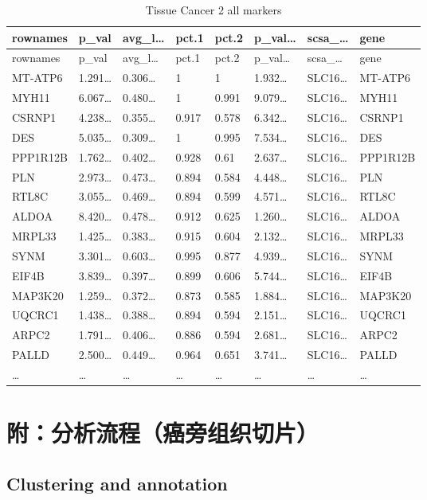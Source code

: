 \documentclass[
]{article}
\begin{document}
\begin{longtable}[]{@{}llllllll@{}}
\caption{\label{tab:Tissue-Cancer-2-all-markers}Tissue Cancer 2 all markers}\tabularnewline
\toprule
rownames & p\_val & avg\_l\ldots{} & pct.1 & pct.2 & p\_val\ldots{} & scsa\_\ldots{} & gene\tabularnewline
\midrule
\endfirsthead
\toprule
rownames & p\_val & avg\_l\ldots{} & pct.1 & pct.2 & p\_val\ldots{} & scsa\_\ldots{} & gene\tabularnewline
\midrule
\endhead
MT-ATP6 & 1.291\ldots{} & 0.306\ldots{} & 1 & 1 & 1.932\ldots{} & SLC16\ldots{} & MT-ATP6\tabularnewline
MYH11 & 6.067\ldots{} & 0.480\ldots{} & 1 & 0.991 & 9.079\ldots{} & SLC16\ldots{} & MYH11\tabularnewline
CSRNP1 & 4.238\ldots{} & 0.355\ldots{} & 0.917 & 0.578 & 6.342\ldots{} & SLC16\ldots{} & CSRNP1\tabularnewline
DES & 5.035\ldots{} & 0.309\ldots{} & 1 & 0.995 & 7.534\ldots{} & SLC16\ldots{} & DES\tabularnewline
PPP1R12B & 1.762\ldots{} & 0.402\ldots{} & 0.928 & 0.61 & 2.637\ldots{} & SLC16\ldots{} & PPP1R12B\tabularnewline
PLN & 2.973\ldots{} & 0.473\ldots{} & 0.894 & 0.584 & 4.448\ldots{} & SLC16\ldots{} & PLN\tabularnewline
RTL8C & 3.055\ldots{} & 0.469\ldots{} & 0.894 & 0.599 & 4.571\ldots{} & SLC16\ldots{} & RTL8C\tabularnewline
ALDOA & 8.420\ldots{} & 0.478\ldots{} & 0.912 & 0.625 & 1.260\ldots{} & SLC16\ldots{} & ALDOA\tabularnewline
MRPL33 & 1.425\ldots{} & 0.383\ldots{} & 0.915 & 0.604 & 2.132\ldots{} & SLC16\ldots{} & MRPL33\tabularnewline
SYNM & 3.301\ldots{} & 0.603\ldots{} & 0.995 & 0.877 & 4.939\ldots{} & SLC16\ldots{} & SYNM\tabularnewline
EIF4B & 3.839\ldots{} & 0.397\ldots{} & 0.899 & 0.606 & 5.744\ldots{} & SLC16\ldots{} & EIF4B\tabularnewline
MAP3K20 & 1.259\ldots{} & 0.372\ldots{} & 0.873 & 0.585 & 1.884\ldots{} & SLC16\ldots{} & MAP3K20\tabularnewline
UQCRC1 & 1.438\ldots{} & 0.388\ldots{} & 0.894 & 0.594 & 2.151\ldots{} & SLC16\ldots{} & UQCRC1\tabularnewline
ARPC2 & 1.791\ldots{} & 0.406\ldots{} & 0.886 & 0.594 & 2.681\ldots{} & SLC16\ldots{} & ARPC2\tabularnewline
PALLD & 2.500\ldots{} & 0.449\ldots{} & 0.964 & 0.651 & 3.741\ldots{} & SLC16\ldots{} & PALLD\tabularnewline
\ldots{} & \ldots{} & \ldots{} & \ldots{} & \ldots{} & \ldots{} & \ldots{} & \ldots{}\tabularnewline
\bottomrule
\end{longtable}

\hypertarget{workflow3}{%
\section{附：分析流程（癌旁组织切片）}\label{workflow3}}

\hypertarget{clustering-and-annotation}{%
\subsection{Clustering and annotation}\label{clustering-and-annotation}}
\end{document}
